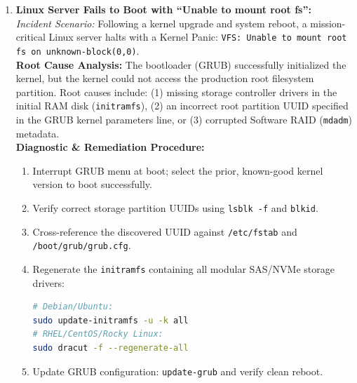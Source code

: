 \begin{enumerate}[label=\textbf{Case \arabic*.},leftmargin=1.5cm]
\item \textbf{Linux Server Fails to Boot with ``Unable to mount root fs'':} \\
\textit{Incident Scenario:} Following a kernel upgrade and system reboot, a mission-critical Linux server halts with a Kernel Panic: \texttt{VFS: Unable to mount root fs on unknown-block(0,0)}. \\
\textbf{Root Cause Analysis:} The bootloader (GRUB) successfully initialized the kernel, but the kernel could not access the production root filesystem partition. Root causes include: (1) missing storage controller drivers in the initial RAM disk (\texttt{initramfs}), (2) an incorrect root partition UUID specified in the GRUB kernel parameters line, or (3) corrupted Software RAID (\texttt{mdadm}) metadata. \\
\textbf{Diagnostic \& Remediation Procedure:}
\begin{enumerate}
    \item Interrupt GRUB menu at boot; select the prior, known-good kernel version to boot successfully.
    \item Verify correct storage partition UUIDs using \texttt{lsblk -f} and \texttt{blkid}.
    \item Cross-reference the discovered UUID against \texttt{/etc/fstab} and \texttt{/boot/grub/grub.cfg}.
    \item Regenerate the \texttt{initramfs} containing all modular SAS/NVMe storage drivers:
\begin{lstlisting}[language=bash]
# Debian/Ubuntu:
sudo update-initramfs -u -k all
# RHEL/CentOS/Rocky Linux:
sudo dracut -f --regenerate-all
\end{lstlisting}
    \item Update GRUB configuration: \texttt{update-grub} and verify clean reboot.
\end{enumerate}


\end{enumerate}
